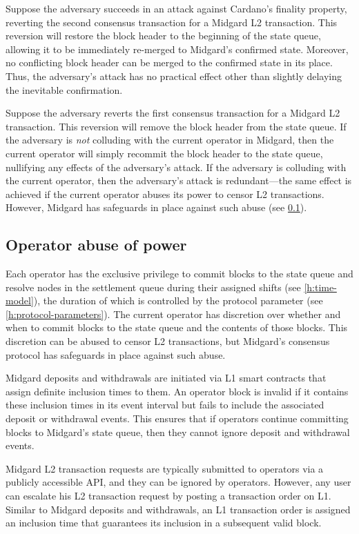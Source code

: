 \documentclass[../midgard.tex]{subfiles}
\begin{document}
Suppose the adversary succeeds in an attack against Cardano's finality property, reverting the second consensus transaction for a Midgard L2 transaction.
This reversion will restore the block header to the beginning of the state queue, allowing it to be immediately re-merged to Midgard's confirmed state.
Moreover, no conflicting block header can be merged to the confirmed state in its place.
Thus, the adversary's attack has no practical effect other than slightly delaying the inevitable confirmation.

Suppose the adversary reverts the first consensus transaction for a Midgard L2 transaction.
This reversion will remove the block header from the state queue.
If the adversary is \emph{not} colluding with the current operator in Midgard, then the current operator will simply recommit the block header to the state queue, nullifying any effects of the adversary's attack.
If the adversary is colluding with the current operator, then the adversary's attack is redundant---the same effect is achieved if the current operator abuses its power to censor L2 transactions.
However, Midgard has safeguards in place against such abuse (see \cref{h:operator-abuse-of-power}).

\subsection{Operator abuse of power}
\label{h:operator-abuse-of-power}

Each operator has the exclusive privilege to commit blocks to the state queue and resolve nodes in the settlement queue during their assigned shifts (see \cref{h:time-model}), the duration of which is controlled by the  protocol parameter (see \cref{h:protocol-parameters}).
The current operator has discretion over whether and when to commit blocks to the state queue and the contents of those blocks.
This discretion can be abused to censor L2 transactions, but Midgard's consensus protocol has safeguards in place against such abuse.

Midgard deposits and withdrawals are initiated via L1 smart contracts that assign definite inclusion times to them.
An operator block is invalid if it contains these inclusion times in its event interval but fails to include the associated deposit or withdrawal events.
This ensures that if operators continue committing blocks to Midgard's state queue, then they cannot ignore deposit and withdrawal events.

Midgard L2 transaction requests are typically submitted to operators via a publicly accessible API, and they can be ignored by operators.
However, any user can escalate his L2 transaction request by posting a transaction order on L1.
Similar to Midgard deposits and withdrawals, an L1 transaction order is assigned an inclusion time that guarantees its inclusion in a subsequent valid block.
\end{document}
